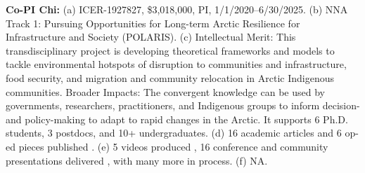 \documentclass[11pt]{article}
\begin{document}
\noindent \textbf{Co-PI Chi:} (a) ICER-1927827, \$3,018,000, PI, 1/1/2020–6/30/2025. (b) NNA Track 1: Pursuing Opportunities for Long-term Arctic Resilience for Infrastructure and Society (POLARIS). (c) Intellectual Merit: This transdisciplinary project is developing theoretical frameworks and models to tackle environmental hotspots of disruption to communities and infrastructure, food security, and migration and community relocation in Arctic Indigenous communities. Broader Impacts: The convergent knowledge can be used by governments, researchers, practitioners, and Indigenous groups to inform decision- and policy-making to adapt to rapid changes in the Arctic. It supports 6 Ph.D. students, 3 postdocs, and 10+ undergraduates. (d) 16 academic articles \cite{yin2022tale, korkut2022addressing, Yin2022, Holen2022, Mucioki2024, Chi2024, Christian2024, Smith2024, Abdar2020, Holen2023, Mucioki2024b, Zhou2024, Mucioki2024c, Hamilton2024, Smith2023, Powell2023} and 6 op-ed pieces published \cite{ArcticPOLARIS, Bogardus2024, Baldwin2023, AumanBauer2019, POLARIS, AumanBauer2020}. (e) 5 videos produced \cite{WoodRiverBridge2022, StakesForStakeholders2022, POLARISTeam2021, ChevakSchool2024, ChevakAlaska2022}, 16 conference and community presentations delivered \cite{Smith2025, Maio2024, Yin2025, Maio2024b, Miller2024, Miller2021, Mucioki2024, Yin2024, Tickamyer2024, Tickamyer2025, Hamilton2024, Maio2024c, Chi2024, Mucioki2024b, Chi2025, Maio2024d}, with many more in process. (f) NA. 



\newpage

 
\end{document}
